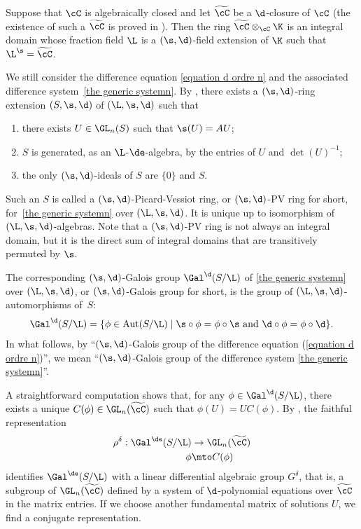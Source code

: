 \begin{lem}\label{lem:extconst}
Suppose that $\cC$ is algebraically closed and let $\widetilde{\cC}$ be a $\d$-closure of $\cC$ (the existence of such a $\widetilde{\cC}$ is proved in \cite{Kol74}). Then the ring $\widetilde{\cC} \otimes_\cC \K$ is an integral domain whose fraction field $\L$ is a $(\s,\d)$-field extension of $\K$ such that ${\L^{\s}=\widetilde{\cC}}$.
\end{lem}

We still consider the difference equation \eqref{equation d ordre n} and the associated difference system~\eqref{the generic systemn}.
By \cite[\S 6.2.1]{HS}, there exists a $(\s,\d)$-ring extension $(S,\s,\d)$ of $(\L,\s,\d)$ such that
\begin{enumerate}
\item
there exists $U \in \GL_{n}(S)$ such that $\s (U)=AU$;
\item
$S$ is generated, as an $\L$-$\de$-algebra, by the entries of $U$ and $\det(U)^{-1}$;
\item
the only $(\s,\d)$-ideals of $S$ are $\{0\}$ and $S$.
\end{enumerate}

Such an $S$ is called a $(\s,\d)$-Picard-Vessiot ring, or $(\s,\d)$-PV ring for short, for~\eqref{the generic systemn} over $(\L,\s,\d)$. It is unique up to isomorphism of $(\L,\s,\d)$-algebras. Note that a $(\s,\d)$\nobreakdash-PV ring is not always an integral domain, but it is the direct sum of integral domains that are transitively permuted by $\s$.

The corresponding $(\s,\d)$-Galois group $\Gal^{\d}(S/\L)$ of \eqref{the generic systemn} over $(\L,\s,\d)$, or $(\s,\d)$\nobreakdash-Galois group for short,
is the group of
$(\L,\s,\d)$-automorphisms of~$S$:
\[
\Gal^{\d}(S/\L)=\{ \phi \in \mathrm{Aut}(S/\L) \mid \s\circ\phi=\phi\circ \s \text{ and } \d\circ\phi=\phi\circ \d \}.
\]
In what follows, by ``$(\s,\d)$-Galois group of the difference equation (\ref{equation d ordre n})'', we mean ``$(\s,\d)$-Galois group of the difference system \eqref{the generic systemn}''.

A straightforward computation shows that, for any $\phi \in \Gal^{\d}(S/\L)$, there exists a unique $C(\phi) \in \GL_{n}(\widetilde{\cC})$ such that $\phi(U)=UC(\phi)$. By \cite[Prop.\,6.18]{HS}, the faithful representation
\begin{align*}
\rho^{\delta} :  \Gal^\de(S/\L) & \to  \GL_{n}(\widetilde{\cC}) \\
\phi & \mto  C(\phi)
\end{align*}
identifies $\Gal^\de(S/\L)$ with a linear differential algebraic group $G^{\delta}$, that is, a subgroup of $\GL_{n}(\widetilde{\cC})$ defined by a system of $\d$-polynomial equations over $\widetilde{\cC}$ in the matrix entries. If we choose another fundamental matrix of solutions $U$, we find a conjugate representation. \par

